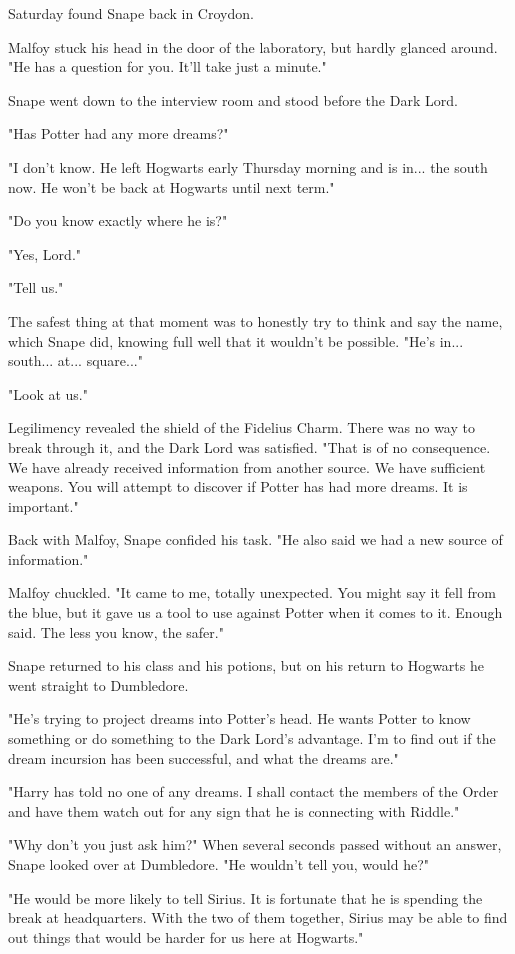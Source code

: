 \documentclass[a4paper,11pt]{article}
\begin{document}
Saturday found Snape back in Croydon.

Malfoy stuck his head in the door of the laboratory, but hardly glanced around. "He has a question for you. It'll take just a minute."

Snape went down to the interview room and stood before the Dark Lord.

"Has Potter had any more dreams?"

"I don't know. He left Hogwarts early Thursday morning and is in... the south now. He won't be back at Hogwarts until next term."

"Do you know exactly where he is?"

"Yes, Lord."

"Tell us."

The safest thing at that moment was to honestly try to think and say the name, which Snape did, knowing full well that it wouldn't be possible. "He's in... south... at... square..."

"Look at us."

Legilimency revealed the shield of the Fidelius Charm. There was no way to break through it, and the Dark Lord was satisfied. "That is of no consequence. We have already received information from another source. We have sufficient weapons. You will attempt to discover if Potter has had more dreams. It is important."

Back with Malfoy, Snape confided his task. "He also said we had a new source of information."

Malfoy chuckled. "It came to me, totally unexpected. You might say it fell from the blue, but it gave us a tool to use against Potter when it comes to it. Enough said. The less you know, the safer."

Snape returned to his class and his potions, but on his return to Hogwarts he went straight to Dumbledore.

"He's trying to project dreams into Potter's head. He wants Potter to know something or do something to the Dark Lord's advantage. I'm to find out if the dream incursion has been successful, and what the dreams are."

"Harry has told no one of any dreams. I shall contact the members of the Order and have them watch out for any sign that he is connecting with Riddle."

"Why don't you just ask him?" When several seconds passed without an answer, Snape looked over at Dumbledore. "He wouldn't tell you, would he?"

"He would be more likely to tell Sirius. It is fortunate that he is spending the break at headquarters. With the two of them together, Sirius may be able to find out things that would be harder for us here at Hogwarts."
\end{document}

